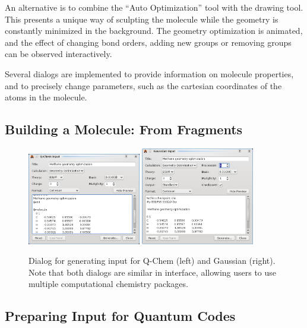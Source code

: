 \documentclass[10pt]{bmc_article}
\newenvironment{bmcformat}{\begin{raggedright}
\baselineskip20pt\sloppy\setboolean{publ}{false}}{\end{raggedright}
\baselineskip20pt\sloppy}
\begin{document}
\begin{bmcformat}
An alternative is to combine the ``Auto Optimization'' tool with the drawing
tool. This presents a unique way of sculpting the molecule while the geometry is
constantly minimized in the background. The geometry optimization is animated,
and the effect of changing bond orders, adding new groups or removing groups can
be observed interactively.

Several dialogs are implemented to provide information on molecule properties,
and
to precisely change parameters, such as the cartesian coordinates of the atoms
in the molecule.

\subsection{Building a Molecule: From Fragments} %

\begin{figure}
  \includegraphics[width=0.44\textwidth]{images/avogadro-q-chem}
  \hspace{0.1cm}
  \includegraphics[width=0.44\textwidth]{images/avogadro-gaussian}
  \caption{Dialog for generating input for Q-Chem (left) and Gaussian (right).
    Note that both dialogs are similar in interface, allowing users to use
    multiple computational chemistry packages.}
  \label{f:quantumdialogs}
\end{figure}

\subsection{Preparing Input for Quantum Codes}


\end{bmcformat}
\end{document}
